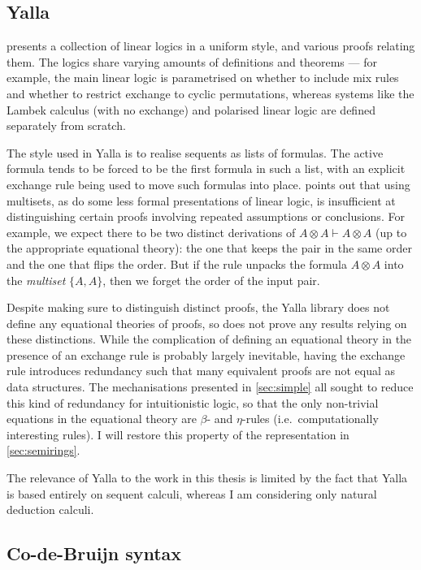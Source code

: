 \subsection{Yalla}

 presents a collection of linear logics in a uniform style, and
various proofs relating them.
The logics share varying amounts of definitions and theorems --- for example,
the main linear logic is parametrised on whether to include mix rules and
whether to restrict exchange to cyclic permutations, whereas systems like the
Lambek calculus (with no exchange) and polarised linear logic are defined
separately from scratch.

The style used in Yalla is to realise sequents as lists of formulas.
The active formula tends to be forced to be the first formula in such a list,
with an explicit exchange rule being used to move such formulas into place.
 points out that using multisets, as do some less formal
presentations of linear logic, is insufficient at distinguishing certain proofs
involving repeated assumptions or conclusions.
For example, we expect there to be two distinct derivations of
$A \otimes A \vdash A \otimes A$ (up to the appropriate equational theory):
the one that keeps the pair in the same order and the one that flips the order.
But if the  rule unpacks the formula $A \otimes A$ into the
\emph{multiset} $\{A, A\}$, then we forget the order of the input pair.

Despite making sure to distinguish distinct proofs, the Yalla library does not
define any equational theories of proofs, so does not prove any results relying
on these distinctions.
While the complication of defining an equational theory in the presence of an
exchange rule is probably largely inevitable, having the exchange rule
introduces redundancy such that many equivalent proofs are not equal as data
structures.
The mechanisations presented in \cref{sec:simple} all sought to reduce this kind
of redundancy for intuitionistic logic, so that the only non-trivial equations
in the equational theory are $\beta$- and $\eta$-rules (i.e.\ computationally
interesting rules).
I will restore this property of the representation in \cref{sec:semirings}.

The relevance of Yalla to the work in this thesis is limited by the fact that
Yalla is based entirely on sequent calculi, whereas I am considering only
natural deduction calculi.

\subsection{Co-de-Bruijn syntax}

